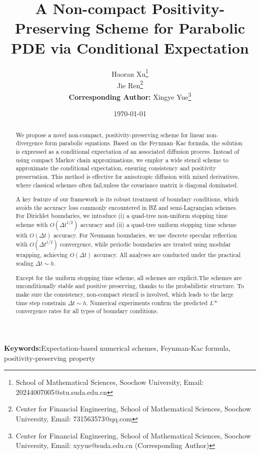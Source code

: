 \documentclass[11pt]{article}
\title{A Non-compact Positivity-Preserving Scheme for Parabolic PDE via Conditional Expectation}
\author{
	Haoran Xu\thanks{School of Mathematical Sciences, Soochow University, Email: 20244007005@stu.suda.edu.cn} \\
	Jie Ren\thanks{Center for Financial Engineering, School of Mathematical Sciences, Soochow University, Email: 731563573@qq.com} \\
	\textbf{Corresponding Author:} Xingye Yue\thanks{Center for Financial Engineering, School of Mathematical Sciences, Soochow University, Email: xyyue@suda.edu.cn (Corresponding Author)}
}
\date{\today}
\theoremstyle{mythm}
\theoremstyle{definition}
\begin{document}
	
	\maketitle
	

	\begin{abstract}
		We propose a novel non-compact, positivity-preserving scheme for linear non-divergence form parabolic equations. Based on the Feynman–Kac formula, the solution is expressed as a conditional expectation of an associated diffusion process. Instead of using compact Markov chain approximations, we employ a wide stencil scheme to approximate the conditional expectation, ensuring consistency and positivity preservation. This method is  effective for anisotropic diffusion with mixed derivatives, where classical schemes often fail,unless the covariance matrix is diagonal dominated.
		
		A key feature of our framework is its robust treatment of boundary conditions, which avoids
		the accuracy loss commonly encountered in BZ and semi-Lagrangian schemes. For Dirichlet boundaries, we introduce (i) a quad-tree non-uniform stopping time scheme with $O(\Delta t^{1/2})$ accuracy and (ii) a quad-tree uniform stopping time scheme with $O(\Delta t)$ accuracy. For Neumann boundaries, we use discrete specular reflection with $O(\Delta t^{1/2})$ convergence, while periodic boundaries are treated using modular wrapping, achieving $O(\Delta t)$ accuracy. All analyses are conducted under the practical scaling $\Delta t \sim h$.
		
		Except for the  uniform stopping time scheme, all schemes are explicit.The schemes are  unconditionally stable and positive preserving, thanks to the probabilistic structure. To make sure the consistency, non-compact stencil is involved, which leads to the large time step constrain $\Delta t \sim h$. Numerical experiments confirm the predicted $L^\infty$ convergence rates for all types of boundary conditions.
	\end{abstract}
	\noindent \textbf{Keywords:}{Expectation-based numerical schemes, Feynman-Kac formula, positivity-preserving property}
\end{document}
